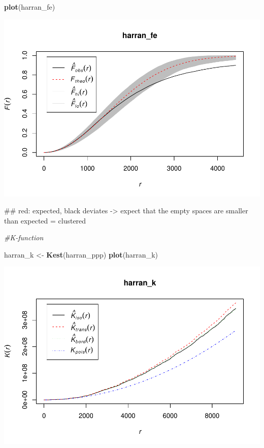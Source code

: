 \documentclass[]{article}
\newenvironment{Shaded}{\begin{snugshade}}{\end{snugshade}}
\newcommand{\KeywordTok}[1]{\textcolor[rgb]{0.13,0.29,0.53}{\textbf{{#1}}}}
\newcommand{\StringTok}[1]{\textcolor[rgb]{0.31,0.60,0.02}{{#1}}}
\newcommand{\CommentTok}[1]{\textcolor[rgb]{0.56,0.35,0.01}{\textit{{#1}}}}
\newcommand{\NormalTok}[1]{{#1}}
\begin{document}
\begin{Shaded}
\begin{Highlighting}[]
\KeywordTok{plot}\NormalTok{(harran_fe)}
\end{Highlighting}
\end{Shaded}

\includegraphics{HarranPlain_files/figure-latex/unnamed-chunk-10-2.pdf}

\begin{Shaded}
\begin{Highlighting}[]
\NormalTok{## red: expected, black deviates -> expect that the empty spaces are smaller than expected = clustered}


\CommentTok{#K-function}

\NormalTok{harran_k <-}\StringTok{ }\KeywordTok{Kest}\NormalTok{(harran_ppp)}
\KeywordTok{plot}\NormalTok{(harran_k)}
\end{Highlighting}
\end{Shaded}

\includegraphics{HarranPlain_files/figure-latex/unnamed-chunk-10-3.pdf}
\end{document}

